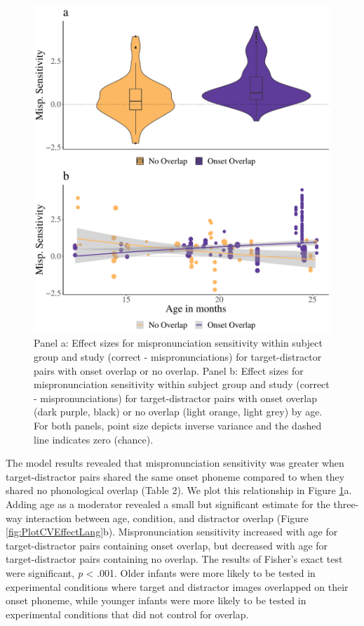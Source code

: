 \documentclass[
  english,
  man, noextraspace]{apa6}
\begin{document}
\begin{figure}
\centering
\includegraphics{VonHolzenBergmann_MPMetaAnalysis_files/figure-latex/PlotDistOverlap-1.pdf}
\caption{\label{fig:PlotDistOverlap}Panel a: Effect sizes for mispronunciation sensitivity within subject group and study (correct - mispronunciations) for target-distractor pairs with onset overlap or no overlap. Panel b: Effect sizes for mispronunciation sensitivity within subject group and study (correct - mispronunciations) for target-distractor pairs with onset overlap (dark purple, black) or no overlap (light orange, light grey) by age. For both panels, point size depicts inverse variance and the dashed line indicates zero (chance).}
\end{figure}

The model results revealed that mispronunciation sensitivity was greater when target-distractor pairs shared the same onset phoneme compared to when they shared no phonological overlap (Table 2). We plot this relationship in Figure \ref{fig:PlotDistOverlap}a. Adding age as a moderator revealed a small but significant estimate for the three-way interaction between age, condition, and distractor overlap (Figure \ref{fig:PlotCVEffectLang}b). Mispronunciation sensitivity increased with age for target-distractor pairs containing onset overlap, but decreased with age for target-distractor pairs containing no overlap. The results of Fisher's exact test were significant, \emph{p} \textless{} .001. Older infants were more likely to be tested in experimental conditions where target and distractor images overlapped on their onset phoneme, while younger infants were more likely to be tested in experimental conditions that did not control for overlap.
\end{document}
